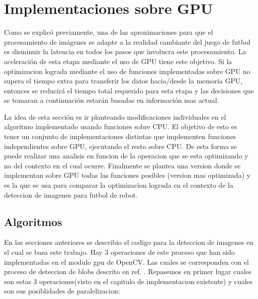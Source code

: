 \documentclass[a4paper,10pt]{report}
\begin{document}
\section{Implementaciones sobre GPU}
Como se explicó previamente, una de las aproximaciones para que el procesamiento de imágenes se adapte a la realidad cambiante del juego de futbol es disminuir la latencia en todos los pasos que involucra este procesamiento.
La aceleración de esta etapa mediante el uso de GPU tiene este objetivo. 
Si la optimizacion lograda mediante el uso de funciones implementadas sobre GPU no supera el tiempo extra para transferir los datos hacia/desde la memoria GPU, entonces se reducirá el tiempo total requerido para esta etapa y las decisiones que se tomaran a continuación estarán basadas en información mas actual.

La idea de esta sección es ir planteando modificaciones individuales en el algoritmo implementado usando funciones sobre CPU.
El objetivo de esto es tener un conjunto de implementaciones distintas que implementen funciones independientes sobre GPU, ejecutando el resto sobre CPU.
De esta forma se puede realizar una analisis en funcion de la operacion que se esta optimizando y no del contexto en el cual ocurre.
Finalmente se plantea una version donde se implementan sobre GPU todas las funciones posibles (version mas optimizada) y es la que se usa para comparar la optimizacion lograda en el contexto de la deteccion de imagenes para futbol de robot.


\subsection{Algoritmos}

En las secciones anteriores se describio el codigo para la deteccion de imagenes en el cual se basa este trabajo. 
Hay 3 operaciones de este proceso que han sido implementadas en el modulo gpu de OpenCV. Las cuales se corresponden con el proceso de deteccion de blobs descrito en ref. \cite[capitulo 5.1]{Jaureguiberry}.
Repasemos en primer lugar cuales son estas 3 operaciones(visto en el capitulo de implementacion existente) y cuales son sus posiblidades de paralelizacion:
\end{document}
